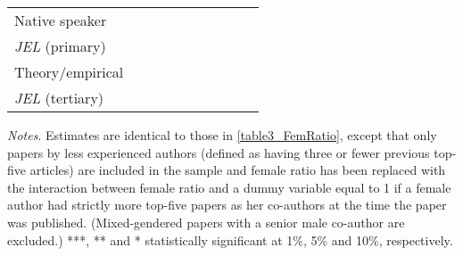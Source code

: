 \begin{table}[H]
\begin{threeparttable}
\begin{tabular}{p{2cm}S@{}S@{}S@{}S@{}S@{}S@{}S@{}S@{}S@{}}
            Native speaker                &               &               &               &               &           {}   &           {}   &           {}   &           {}   &           {}   \\
            \textit{JEL} (primary)        &               &               &               &               &               &               &           {}   &               &               \\
            Theory/empirical              &               &               &               &               &               &               &               &           {}   &               \\
            \textit{JEL} (tertiary)       &               &               &               &               &               &               &               &               &           {}   \\
            \bottomrule
        \end{tabular}
        \begin{tablenotes}
            \tiny
            \item \textit{Notes}. Estimates are identical to those in \autoref{table3_FemRatio}, except that only papers by less experienced authors (defined as having three or fewer previous top-five articles) are included in the sample and female ratio has been replaced with the interaction between female ratio and a dummy variable equal to 1 if a female author had strictly more top-five papers as her co-authors at the time the paper was published. (Mixed-gendered papers with a senior male co-author are excluded.) ***, ** and * statistically significant at 1\%, 5\% and 10\%, respectively.
        \end{tablenotes}
    \end{threeparttable}
\end{table}